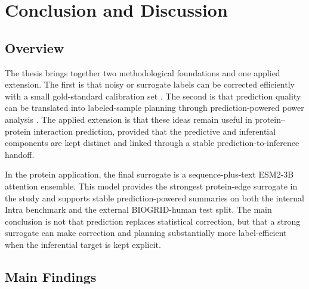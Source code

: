 \chapter{Conclusion and Discussion} \label{chap:conclusion}

\section{Overview}

The thesis brings together two methodological foundations and one applied extension. The first is that noisy or surrogate labels can be corrected efficiently with a small gold-standard calibration set \parencite{llmjudge_eif}. The second is that prediction quality can be translated into labeled-sample planning through prediction-powered power analysis \parencite{ppi_power}. The applied extension is that these ideas remain useful in protein--protein interaction prediction, provided that the predictive and inferential components are kept distinct and linked through a stable prediction-to-inference handoff.

In the protein application, the final surrogate is a sequence-plus-text ESM2-3B attention ensemble. This model provides the strongest protein-edge surrogate in the study and supports stable prediction-powered summaries on both the internal Intra benchmark and the external BIOGRID-human test split. The main conclusion is not that prediction replaces statistical correction, but that a strong surrogate can make correction and planning substantially more label-efficient when the inferential target is kept explicit.

\section{Main Findings}

